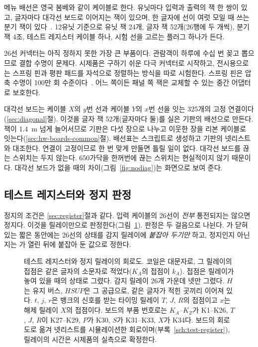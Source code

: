 메뉴 배선은 영국 봄베와 같이 케이블로 한다. 유닛마다 입력과 출력의 잭 한 쌍이 있고, 글자마다 대각선 보드로
이어지는 잭이 있으며, 한 글자에 선이 여럿 모일 때 쓰는 분기 잭이 있다~\cite{us6812report1944}. 12유닛 기준으로
유닛 잭 24개, 글자 잭 52개(26행에 두 개씩), 분기 잭 4조, 테스트 레지스터 케이블 하나, 시험 선을 고르는 플러그
하나가 든다.

26선 커넥터는 아직 정하지 못한 가장 큰 부품이다. 관람객이 하루에 수십 번 꽂고 뽑으므로 결합 수명이 문제다.
시제품은 구하기 쉬운 다극 커넥터로 시작하고, 전시용으로는 스프링 핀과 평판 패드를 자석으로 정렬하는 방식을
따로 시험한다. 스프링 핀은 압축 수명이 100만 회 수준이다~\cite{millmax-springpin}. 어느 쪽이든 패널 쪽 잭은
교체할 수 있는 중간 어댑터로 보호한다.

대각선 보드는 케이블 $X$의 $y$번 선과 케이블 $Y$의 $x$번 선을 잇는 325개의 고정 연결이다
(\ref{sec:diagonal}절). 이것을 글자 잭 52개(글자마다 둘)를 실은 기판의 배선으로 만든다. 잭이 1.4~m 넘게 늘어서므로
기판은 다섯 장으로 나누고 이웃한 장을 리본 케이블로 잇는다(\ref{sec:hw-boards-common}절). 배선표는 스크립트로
생성하고 기판의 넷리스트와 대조한다. 연결이 고정이므로 한 번 맞게 만들면 틀릴 일이 없다. 대각선 보드를
끊는 스위치는 두지 않는다. 650가닥을 한꺼번에 끊는 스위치는 현실적이지 않기 때문이다. 대각선 보드가 없을
때의 차이(그림~\ref{fig:nodiag})는 화면으로 보여 준다.

\subsection{테스트 레지스터와 정지 판정}\label{sec:hw-register}

정지의 조건은 \ref{sec:register}절과 같다. 입력 케이블의 26선이 \emph{전부} 통전되지는 않으면 정지다.
이것을 릴레이만으로 판정한다(그림~\ref{fig:hw-register}). 판정은 두 걸음으로 나뉜다. 가 닫혀
있는 짧은 동안에는 26선의 상태를 감지 릴레이에 \emph{붙잡아 두기만} 하고, 정지인지 아닌지는 가
열린 뒤에 붙잡아 둔 값으로 정한다.

\begin{figure}[p]
\centering

\caption{테스트 레지스터와 정지 릴레이의 회로도. 코일은 대문자로, 그 릴레이의 접점은 같은 글자의 소문자로
적었다($K_A$의 접점이 $k_A$). 접점은 릴레이가 놓여 있을 때의 상태로 그렸다. 감지 릴레이 26개 가운데
넷만 그렸다. $H$는 유지 버스, $HSUP$은 그 공급으로, 같은 글자가 적힌 곳끼리 이어져 있다. $t$, $j$, $r$은
뱅크의 신호를 받는 타이밍 릴레이 $T$, $J$, $R$의 접점이고 $x$는 해제 릴레이 $X$의 접점이다. 보드의 부품 번호로는
$K_A$--$K_Z$가 K1--K26, $T$, $J$, $R$이 K27--K29, $P$가 K30, $S$가 K31--K33, $X$가 K34다. 보드의 회로도로 옮겨
넷리스트를 시뮬레이션한 회로이며(부록~\ref{sch:test-register}), 릴레이의 시간은 시제품의 실측으로 확정한다.}
\label{fig:hw-register}
\end{figure}

